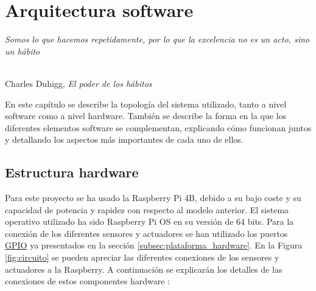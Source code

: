 \chapter{Arquitectura software}
\label{cap:capitulo5}

\begin{flushright}
\begin{minipage}[]{10cm}
\emph{Somos lo que hacemos repetidamente, por lo que la excelencia no es un acto, sino un hábito}\\
\end{minipage}\\

Charles Duhigg, \textit{El poder de los hábitos}\\
\end{flushright}

\vspace{1cm}


En este capítulo se describe la topología del sistema utilizado, tanto a nivel software como a nivel hardware. También se describe la forma en la que los diferentes elementos software se complementan, explicando cómo funcionan juntos y detallando los aspectos más importantes de cada uno de ellos.


\section{Estructura hardware}
\label{sec:estructura_hardware}


Para este proyecto se ha usado la Raspberry Pi 4B, debido a su bajo coste y su capacidad de potencia y rapidez con respecto al modelo anterior. El sistema operativo utilizado ha sido Raspberry Pi OS en su versión de 64 bits. Para la conexión de los diferentes sensores y actuadores se han utilizado los puertos \hyperlink{GPIO}{GPIO} ya presentados en la sección \ref{subsec:plataforma_hardware}. En la Figura \ref{fig:circuito} se pueden apreciar las diferentes conexiones de los sensores y actuadores a la Raspberry. A continuación se explicarán los detalles de las conexiones de estos componentes hardware :



